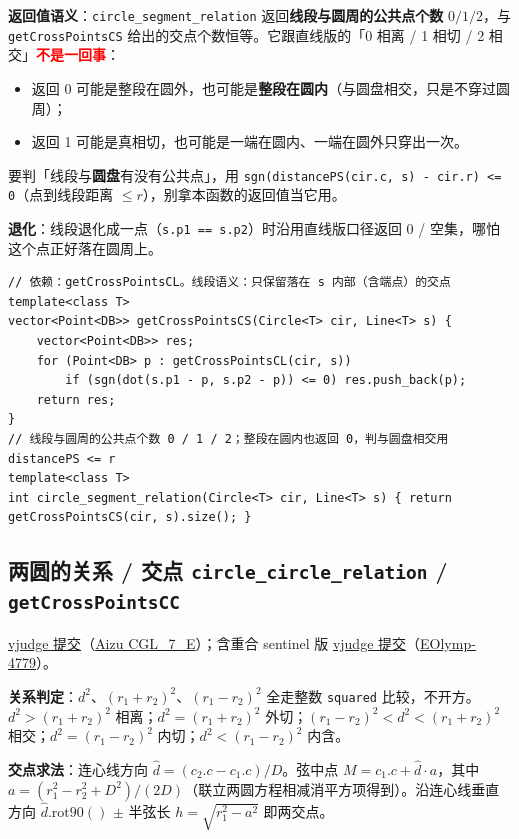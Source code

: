 		\textbf{返回值语义}：\texttt{circle\_segment\_relation} 返回\textbf{线段与圆周的公共点个数} $0 / 1 / 2$，与 \texttt{getCrossPointsCS} 给出的交点个数恒等。它跟直线版的「0 相离 / 1 相切 / 2 相交」\textcolor{red}{\textbf{不是一回事}}：
		\begin{itemize}
			\setlength\itemsep{0pt}
			\item 返回 0 可能是整段在圆外，也可能是\textbf{整段在圆内}（与圆盘相交，只是不穿过圆周）；
			\item 返回 1 可能是真相切，也可能是一端在圆内、一端在圆外只穿出一次。
		\end{itemize}
		要判「线段与\textbf{圆盘}有没有公共点」，用 \texttt{sgn(distancePS(cir.c, s) - cir.r) <= 0}（点到线段距离 $\le r$），别拿本函数的返回值当它用。

		\textbf{退化}：线段退化成一点（\texttt{s.p1 == s.p2}）时沿用直线版口径返回 0 / 空集，哪怕这个点正好落在圆周上。

\begin{verbatim}
// 依赖：getCrossPointsCL。线段语义：只保留落在 s 内部（含端点）的交点
template<class T>
vector<Point<DB>> getCrossPointsCS(Circle<T> cir, Line<T> s) {
	vector<Point<DB>> res;
	for (Point<DB> p : getCrossPointsCL(cir, s))
		if (sgn(dot(s.p1 - p, s.p2 - p)) <= 0) res.push_back(p);
	return res;
}
// 线段与圆周的公共点个数 0 / 1 / 2；整段在圆内也返回 0，判与圆盘相交用 distancePS <= r
template<class T>
int circle_segment_relation(Circle<T> cir, Line<T> s) { return getCrossPointsCS(cir, s).size(); }
\end{verbatim}

		\subsection{两圆的关系 / 交点 \texttt{circle\_circle\_relation} / \texttt{getCrossPointsCC}}

		\href{https://vjudge.net/solution/69929473}{vjudge 提交}（\href{https://vjudge.net/problem/Aizu-CGL_7_E}{Aizu CGL\_7\_E}）；含重合 sentinel 版 \href{https://vjudge.net/solution/69929406}{vjudge 提交}（\href{https://vjudge.net/problem/EOlymp-4779}{EOlymp-4779}）。

		\textbf{关系判定}：$d^2$、$(r_1 + r_2)^2$、$(r_1 - r_2)^2$ 全走整数 \texttt{squared} 比较，不开方。$d^2 > (r_1 + r_2)^2$ 相离；$d^2 = (r_1 + r_2)^2$ 外切；$(r_1 - r_2)^2 < d^2 < (r_1 + r_2)^2$ 相交；$d^2 = (r_1 - r_2)^2$ 内切；$d^2 < (r_1 - r_2)^2$ 内含。

		\textbf{交点求法}：连心线方向 $\hat{d} = (c_2.c - c_1.c) / D$。弦中点 $M = c_1.c + \hat{d} \cdot a$，其中 $a = (r_1^2 - r_2^2 + D^2) / (2 D)$（联立两圆方程相减消平方项得到）。沿连心线垂直方向 $\hat{d}.\mathrm{rot90}()$ $\pm$ 半弦长 $h = \sqrt{r_1^2 - a^2}$ 即两交点。

